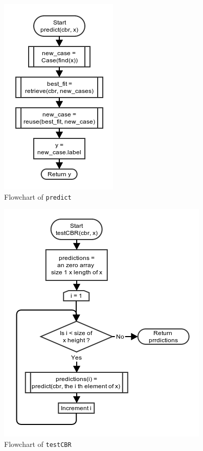 \documentclass[10pt,a4paper]{article}
\begin{document}
\begin{figure}[!ht]
	\centering
	\includegraphics[scale=0.7]{images/flow_chart/predict.png}
	\caption{Flowchart of \tt{predict}}
	\label{fig:predict}
\end{figure}

\begin{figure}[!ht]
	\centering
	\includegraphics[scale=0.7]{images/flow_chart/testcbr.png}
	\caption{Flowchart of \tt{testCBR}}
	\label{fig:testcbr}
\end{figure}




\end{document}
